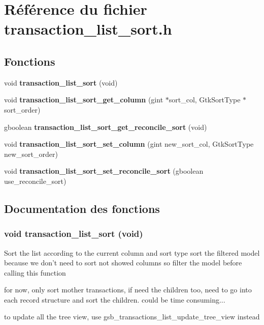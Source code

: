 \section{Référence du fichier transaction\_\-list\_\-sort.h}
\label{transaction__list__sort_8h}
\subsection*{Fonctions}
\begin{DoxyCompactItemize}
\item 
void {\bf transaction\_\-list\_\-sort} (void)
\item 
void {\bf transaction\_\-list\_\-sort\_\-get\_\-column} (gint $\ast$sort\_\-col, GtkSortType $\ast$sort\_\-order)
\item 
gboolean {\bf transaction\_\-list\_\-sort\_\-get\_\-reconcile\_\-sort} (void)
\item 
void {\bf transaction\_\-list\_\-sort\_\-set\_\-column} (gint new\_\-sort\_\-col, GtkSortType new\_\-sort\_\-order)
\item 
void {\bf transaction\_\-list\_\-sort\_\-set\_\-reconcile\_\-sort} (gboolean use\_\-reconcile\_\-sort)
\end{DoxyCompactItemize}


\subsection{Documentation des fonctions}
\subsubsection[{transaction\_\-list\_\-sort}]{\setlength{\rightskip}{0pt plus 5cm}void transaction\_\-list\_\-sort (void)}\label{transaction__list__sort_8h_a4437cb573f9bba01a794b2e2695e58d4}
Sort the list according to the current column and sort type sort the filtered model because we don't need to sort not showed columns so filter the model before calling this function

for now, only sort mother transactions, if need the children too, need to go into each record structure and sort the children. could be time consuming...

to update all the tree view, use gsb\_\-transactions\_\-list\_\-update\_\-tree\_\-view instead


